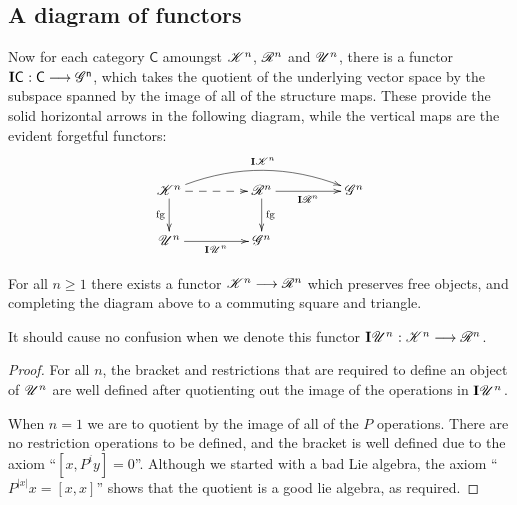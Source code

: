 \documentclass[11pt]{article}
\newcommand{\PRLie}[1]{\scrR^{#1}}%
\newcommand{\LL}[1]{{\scrK}^{#1}}%
\newcommand{\GR}[1]{\scrG^{#1}}%
\newcommand{\GS}[1]{\scrG\!\scrS^{#1}}
\newcommand{\nontop}[1]{\scrU^{#1}}%
\newcommand{\Ind}[2][]{\mathbf{I}{#2}_{#1}}%
\newcommand{\forget}{\mathrm{fg}}
\begin{document}
\begin{DiagramOfFunctors}
\section*{A diagram of functors}
Now for each category $\mathsf{C}$ amoungst $\LL{n}$, $\PRLie{n}$ and $\nontop{n}$, there is a functor $\Ind{\mathsf{C}}:\mathsf{C\overset{}{\to}\GR{n}}$, which takes the quotient of the underlying vector space by the subspace spanned by the image of all of the structure maps. These provide the solid horizontal arrows in the following diagram, while the vertical maps are the evident forgetful functors: %
\[\xymatrix@R=8mm@C=15mm@!C{
\LL{n}
\ar@/^1.5em/[rr]^-{\Ind{\LL{n}}}
\ar[d]_-{\forget}
\ar@{-->}[r]_-{}%
&%
\PRLie{n}
\ar[d]^-{\forget}
\ar[r]_-{\Ind{\PRLie{n}}}
&%
\GR{n}
\\%
\nontop{n}
\ar[r]_-{\Ind{\nontop{n}}}
&%
\GR{n}
&%
}\]
\begin{prop*}
For all $n\geq1$ there exists a functor $\LL{n}\to\PRLie{n}$ which preserves free objects, and completing the diagram above to a commuting square and triangle.
\end{prop*}
\noindent It should cause no confusion when we denote this functor $\Ind{\nontop{n}}:\LL{n}\to \PRLie{n}$.
\begin{proof}
For all $n$, the bracket and restrictions that are required to define an object of $\nontop{n}$ are well defined after quotienting out the image of the operations in $\Ind{\nontop{n}}$.

When $n=1$ we are to quotient by the image of all of the $P$ operations. There are no restriction operations to be defined, and the bracket is well defined due to the axiom ``$[x,P^iy]=0$''. Although we started with a bad Lie algebra, the axiom ``$P^{|x|}x=[x,x]$'' shows that the quotient is a good lie algebra, as required.


\end{proof}
\end{DiagramOfFunctors}
\end{document}

